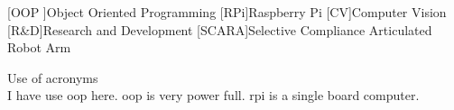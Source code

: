 \begin{acronym}
	[OOP ]{Object Oriented Programming }
	[RPi]{Raspberry Pi}
	[CV]{Computer Vision}
	[R\&D]{Research and Development}
	[SCARA]{Selective Compliance Articulated Robot Arm}
\end{acronym}

Use of acronyms\\

I have use \ac{oop} here. \ac{oop} is very power full. \Ac{rpi} is a single board computer. 
